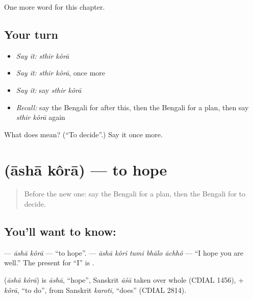 \begin{grammarlens}[title={What you've built}]
One more word for this chapter.
\end{grammarlens}

\subsection*{Your turn}
\begin{itemize}
\raggedright
  \item \emph{Say it:} \emph{sthir kôrā}
  \item \emph{Say it:} \emph{sthir kôrā}, once more
  \item \emph{Say it:} say \emph{sthir kôrā}
  \item \emph{Recall:} say the Bengali for after this, then the Bengali for a plan, then say \emph{sthir kôrā} again
\end{itemize}

\begin{tcolorbox}[breakable,colback=teal!4,colframe=teal!35!black,title={Before you move on}]
What does   mean? (\textquotedblleft{}To decide\textquotedblright{}.) Say it once more.
\end{tcolorbox}
\section[\texorpdfstring{\bn{আশা} \bn{করা} (āshā kôrā)}{আশা করা (āshā kôrā)}]{  (āshā kôrā) — to hope}

\label{lesson:BN-C146-asha-kora}



\begin{quote}
Before the new one: say the Bengali for a plan, then the Bengali for to decide.
\end{quote}

\subsection*{You'll want to know:  }
\textbf{ } — \emph{āshā kôrā} — \textquotedblleft{}to hope\textquotedblright{}. \textbf{    } — \emph{āshā kôri tumi bhālo āchhô} — \textquotedblleft{}I hope you are well.\textquotedblright{} The present for \textquotedblleft{}I\textquotedblright{} is \textbf{}.

\begin{cousinweb}
\textbf{ } (\emph{āshā kôrā}) is \emph{āshā}, \textquotedblleft{}hope\textquotedblright{}, Sanskrit \emph{āśā} taken over whole (CDIAL 1456), + \emph{kôrā}, \textquotedblleft{}to do\textquotedblright{}, from Sanskrit \emph{karoti}, \textquotedblleft{}does\textquotedblright{} (CDIAL 2814).
\end{cousinweb}

